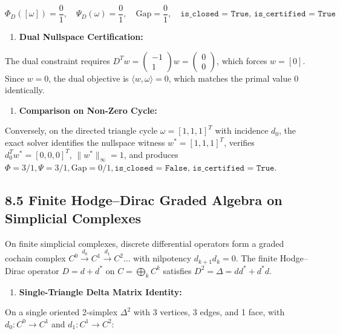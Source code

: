\documentclass[11pt]{article}
\begin{document}
\begin{equation*}
   \Phi_D([\omega]) = \frac{0}{1}, \quad \Psi_D(\omega) = \frac{0}{1}, \quad \text{Gap} = \frac{0}{1}, \quad \texttt{is\_closed = True, is\_certified = True}
\end{equation*}

\begin{enumerate}[leftmargin=1.4em,itemsep=0.2em]
\item \textbf{Dual Nullspace Certification:}
\end{enumerate}
The dual constraint requires $D^T w = \begin{pmatrix} -1 \\ 1 \end{pmatrix} w = \begin{pmatrix} 0 \\ 0 \end{pmatrix}$, which forces $w = [0]$. Since $w = 0$, the dual objective is $\langle w, \omega \rangle = 0$, which matches the primal value $0$ identically.

\begin{enumerate}[leftmargin=1.4em,itemsep=0.2em]
\item \textbf{Comparison on Non-Zero Cycle:}
\end{enumerate}
Conversely, on the directed triangle cycle $\omega = [1, 1, 1]^T$ with incidence $d_0$, the exact solver identifies the nullspace witness $w^* = [1, 1, 1]^T$, verifies $d_0^T w^* = [0, 0, 0]^T$, $\|w^*\|_\infty = 1$, and produces $\Phi = 3/1, \Psi = 3/1, \text{Gap} = 0/1, \texttt{is\_closed = False, is\_certified = True}$.

\subsection{\texorpdfstring{8.5 Finite Hodge--Dirac Graded Algebra on Simplicial Complexes}{8.5 Finite Hodge--Dirac Graded Algebra on Simplicial Complexes}}

On finite simplicial complexes, discrete differential operators form a graded cochain complex $C^0 \xrightarrow{d_0} C^1 \xrightarrow{d_1} C^2 \dots$ with nilpotency $d_{k+1} d_k = 0$. The finite Hodge--Dirac operator $D = d + d^*$ on $C = \bigoplus_k C^k$ satisfies $D^2 = \Delta = d d^* + d^* d$.

\begin{enumerate}[leftmargin=1.4em,itemsep=0.2em]
\item \textbf{Single-Triangle Delta Matrix Identity:}
\end{enumerate}
On a single oriented 2-simplex $\Delta^2$ with 3 vertices, 3 edges, and 1 face, with $d_0: C^0 \to C^1$ and $d_1: C^1 \to C^2$:
\end{document}
